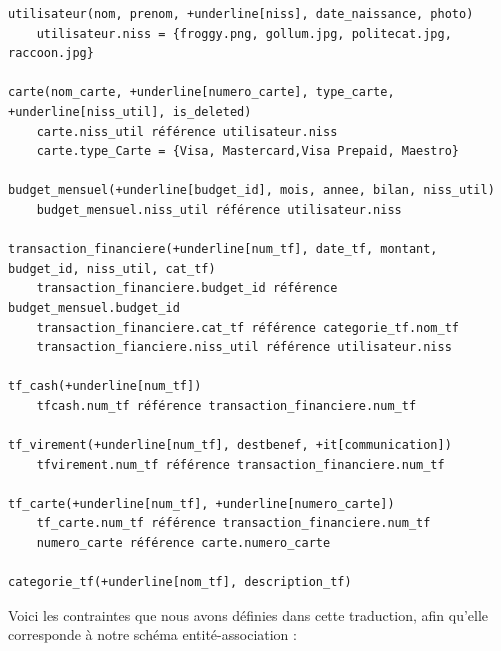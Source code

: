 \documentclass[a4paper,12pt]{article}
\begin{document}
\begin{Verbatim}[commandchars=+\[\]]
utilisateur(nom, prenom, +underline[niss], date_naissance, photo)
	utilisateur.niss = {froggy.png, gollum.jpg, politecat.jpg, raccoon.jpg}

carte(nom_carte, +underline[numero_carte], type_carte, +underline[niss_util], is_deleted)
	carte.niss_util référence utilisateur.niss
	carte.type_Carte = {Visa, Mastercard,Visa Prepaid, Maestro}

budget_mensuel(+underline[budget_id], mois, annee, bilan, niss_util) 
	budget_mensuel.niss_util référence utilisateur.niss

transaction_financiere(+underline[num_tf], date_tf, montant, budget_id, niss_util, cat_tf)
	transaction_financiere.budget_id référence budget_mensuel.budget_id
	transaction_financiere.cat_tf référence categorie_tf.nom_tf
	transaction_fianciere.niss_util référence utilisateur.niss

tf_cash(+underline[num_tf])
	tfcash.num_tf référence transaction_financiere.num_tf

tf_virement(+underline[num_tf], destbenef, +it[communication])
	tfvirement.num_tf référence transaction_financiere.num_tf

tf_carte(+underline[num_tf], +underline[numero_carte])
	tf_carte.num_tf référence transaction_financiere.num_tf	
	numero_carte référence carte.numero_carte

categorie_tf(+underline[nom_tf], description_tf)
\end{Verbatim}

Voici les contraintes que nous avons définies dans cette traduction, afin qu'elle corresponde à notre schéma entité-association :
\end{document}
